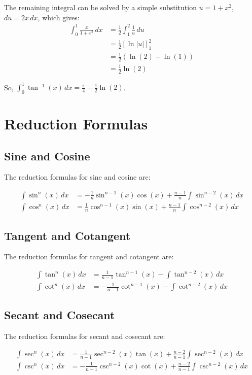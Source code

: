 \documentclass{article}
\begin{document}
The remaining integral can be solved by a simple substitution $u = 1 + x^2$, $du = 2x \, dx$, which gives:
\begin{align*}
    \int_0^1 \frac{x}{1+x^2} \, dx &= \frac{1}{2} \int_1^2 \frac{1}{u} \, du \\
    &= \frac{1}{2} [\ln|u|]_1^2 \\
    &= \frac{1}{2} (\ln(2) - \ln(1)) \\
    &= \frac{1}{2} \ln(2)
\end{align*}

So, $\int_0^1 \tan^{-1}(x) \, dx = \frac{\pi}{4} - \frac{1}{2} \ln(2)$.

\section{Reduction Formulas}

\subsection{Sine and Cosine}

The reduction formulas for sine and cosine are:

\begin{align*}
    \int \sin^n(x) \, dx &= -\frac{1}{n} \sin^{n-1}(x) \cos(x) + \frac{n-1}{n} \int \sin^{n-2}(x) \, dx \\
    \int \cos^n(x) \, dx &= \frac{1}{n} \cos^{n-1}(x) \sin(x) + \frac{n-1}{n} \int \cos^{n-2}(x) \, dx
\end{align*}

\subsection{Tangent and Cotangent}

The reduction formulas for tangent and cotangent are:

\begin{align*}
    \int \tan^n(x) \, dx &= \frac{1}{n-1} \tan^{n-1}(x) - \int \tan^{n-2}(x) \, dx \\
    \int \cot^n(x) \, dx &= -\frac{1}{n-1} \cot^{n-1}(x) - \int \cot^{n-2}(x) \, dx
\end{align*}

\subsection{Secant and Cosecant}

The reduction formulas for secant and cosecant are:

\begin{align*}
    \int \sec^n(x) \, dx &= \frac{1}{n-1} \sec^{n-2}(x) \tan(x) + \frac{n-2}{n-1} \int \sec^{n-2}(x) \, dx \\
    \int \csc^n(x) \, dx &= -\frac{1}{n-1} \csc^{n-2}(x) \cot(x) + \frac{n-2}{n-1} \int \csc^{n-2}(x) \, dx
\end{align*}
\end{document}
